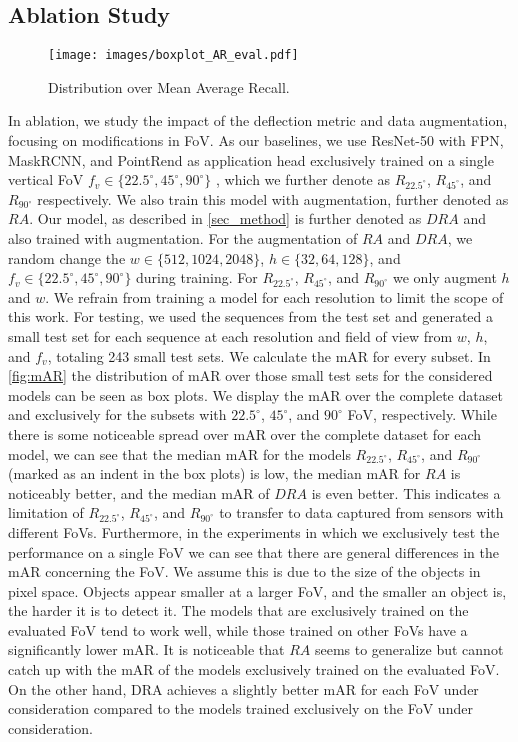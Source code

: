 \subsection{Ablation Study}

\begin{figure*}[h]
    \centering
    \texttt{[image: images/boxplot\_AR\_eval.pdf]}
    \caption{Distribution over Mean Average Recall.}
    \label{fig:mAR}
\end{figure*}

In ablation, we study the impact of the deflection metric and data augmentation, focusing on modifications in FoV. 
As our baselines, we use ResNet-50 with FPN, MaskRCNN, and PointRend as application head exclusively trained on a single vertical FoV $f_v \in \{22.5^\circ, 45^\circ, 90^\circ\}$ , which we further denote as $R_{22.5^\circ}$, $R_{45^\circ}$, and $R_{90^\circ}$ respectively. We also train this model with augmentation, further denoted as $RA$. Our model, as described in \autoref{sec_method} is further denoted as $DRA$ and also trained with augmentation. For the augmentation of $RA$ and $DRA$, we random change the $w \in \{512,1024,2048\}$, $h \in \{32,64,128\}$, and  $f_v \in \{22.5^\circ, 45^\circ, 90^\circ\}$ during training. For $R_{22.5^\circ}$, $R_{45^\circ}$, and $R_{90^\circ}$ we only augment $h$ and $w$. We refrain from training a model for each resolution to limit the scope of this work. For testing, we used the sequences from the test set and generated a small test set for each sequence at each resolution and field of view from $w$, $h$, and $f_v$, totaling 243 small test sets. We calculate the mAR for every subset. In \autoref{fig:mAR} the distribution of mAR over those small test sets for the considered models can be seen as box plots. We display the mAR over the complete dataset and exclusively for the subsets with $22.5^\circ$, $45^\circ$, and  $90^\circ$ FoV, respectively.
While there is some noticeable spread over mAR over the complete dataset for each model, we can see that the median mAR for the models $R_{22.5^\circ}$, $R_{45^\circ}$, and $R_{90^\circ}$ (marked as an indent in the box plots) is low, the median mAR for $RA$ is noticeably better, and the median mAR of $DRA$ is even better. This indicates a limitation of $R_{22.5^\circ}$, $R_{45^\circ}$, and $R_{90^\circ}$ to transfer to data captured from sensors with different FoVs. Furthermore, in the experiments in which we exclusively test the performance on a single FoV we can see that there are general differences in the mAR concerning the FoV.
We assume this is due to the size of the objects in pixel space. Objects appear smaller at a larger FoV, and the smaller an object is, the harder it is to detect it. 
The models that are exclusively trained on the evaluated FoV tend to work well, while those trained on other FoVs have a significantly lower mAR. It is noticeable that $RA$ seems to generalize but cannot catch up with the mAR of the models exclusively trained on the evaluated FoV. On the other hand, DRA achieves a slightly better mAR for each FoV under consideration compared to the models trained exclusively on the FoV under consideration.
\\

